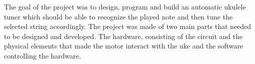 The goal of the project was to design, program and build an automatic ukulele tuner which should be able to recognize the played note and then tune the selected string accordingly. The project was made of two main parts that needed to be designed and developed. The hardware, consisting of the circuit and the physical elements that made the motor interact with the uke and the software controlling the hardware.